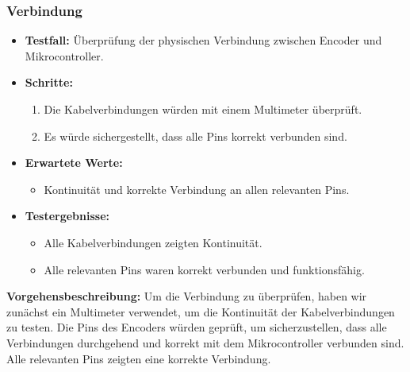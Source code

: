 \subsubsection{Verbindung}
\begin{itemize}
	\item \textbf{Testfall:} Überprüfung der physischen Verbindung zwischen Encoder und Mikrocontroller.
	\item \textbf{Schritte:}
	\begin{enumerate}
		\item Die Kabelverbindungen würden mit einem Multimeter überprüft.
		\item Es würde sichergestellt, dass alle Pins korrekt verbunden sind.
	\end{enumerate}
	\item \textbf{Erwartete Werte:}
	\begin{itemize}
		\item Kontinuität und korrekte Verbindung an allen relevanten Pins.
	\end{itemize}
	\item \textbf{Testergebnisse:}
	\begin{itemize}
		\item Alle Kabelverbindungen zeigten Kontinuität.
		\item Alle relevanten Pins waren korrekt verbunden und funktionsfähig.
	\end{itemize}
\end{itemize}


\textbf{Vorgehensbeschreibung:}
Um die Verbindung zu überprüfen, haben wir zunächst ein Multimeter verwendet, um die Kontinuität der Kabelverbindungen zu testen. Die Pins des Encoders würden geprüft, um sicherzustellen, dass alle Verbindungen durchgehend und korrekt mit dem Mikrocontroller verbunden sind. Alle relevanten Pins zeigten eine korrekte Verbindung.

